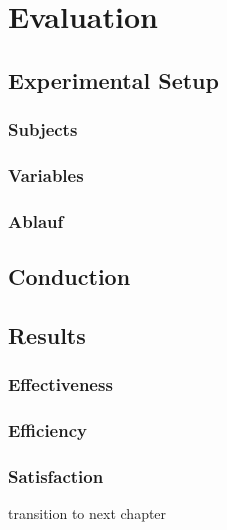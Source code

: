 
\section{Evaluation}
\label{sec:evaluation}

\subsection{Experimental Setup} %
\label{sub:experimental_setup}

\subsubsection{Subjects} %
\label{ssub:subjects}


\subsubsection{Variables} %
\label{ssub:variables}


\subsubsection{Ablauf} %
\label{ssub:ablauf}



\subsection{Conduction} %
\label{ssub:conduction}


\subsection{Results} %
\label{sub:results}

\subsubsection{Effectiveness}

\subsubsection{Efficiency}

\subsubsection{Satisfaction}


\vspace{2em}
transition to next chapter

